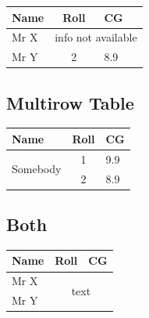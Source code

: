 \documentclass[letter, 12pt]{article}
\begin{document}
\begin{tabular}{|l|cl|}
	\hline
	Name & Roll & CG   \\
	\hline
	Mr X & \multicolumn{2}{c|}{info not available} \\ 
	\cline{2-3}
	Mr Y & 2   &  8.9 \\ 
	\cline{1-3}
\end{tabular}

\subsection{Multirow  Table}
\begin{tabular}{|l|cl|}
	\hline
	Name & Roll & CG   \\
	\hline
	\multirow{2}{*}{Somebody} & 1   &  9.9 \\ 
	\cline{2-3}
	 & 2   &  8.9 \\ 
	 \hline

\end{tabular}

\subsection{Both}
\begin{tabular}{|l|cl|}
	\hline
	Name & Roll & CG   \\
	\hline
	Mr X & \multicolumn{2}{|c|}{\multirow{2}{*}{text}} \\
	Mr Y & & \\ 
	\hline
	
\end{tabular}
\end{document}
